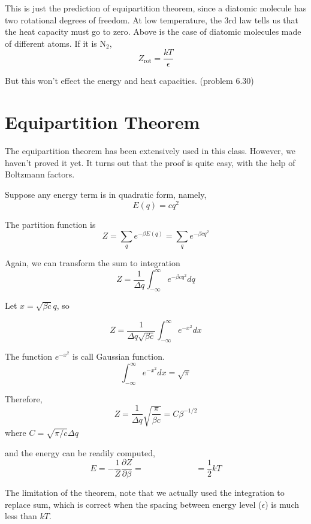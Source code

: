 This is just the prediction of equipartition theorem, since a diatomic molecule has two rotational degrees of freedom. 
At low temperature, the 3rd law tells us that the heat capacity must go to zero.
Above is the case of diatomic molecules made of different atoms. If it is N$_2$, 
\begin{equation}
Z_\text{rot} = \frac{kT}{\epsilon}
\end{equation}
 
But this won't effect the energy and heat capacities. (problem 6.30)


\section{Equipartition Theorem}
The equipartition theorem has been extensively used in this class. However, we haven't proved it yet.
It turns out that the proof is quite easy, with the help of Boltzmann factors.

Suppose any energy term is in quadratic form, namely,
\begin{equation}
E(q) = cq^2
\end{equation}

The partition function is
\begin{equation}
Z = \sum_q e^{-\beta E(q)} = \sum_q e^{-\beta cq^2}
\end{equation}

Again, we can transform the sum to integration
\begin{equation}
Z = \frac{1}{\Delta{q}} \int_{-\infty}^{\infty}  e^{-\beta cq^2} dq
\end{equation}

Let $x=\sqrt{\beta c}q$, so 

\begin{equation}
Z = \frac{1}{\Delta{q}\sqrt{\beta c}}\int_{-\infty}^{\infty}  e^{-x^2} dx
\end{equation}

The function $e^{-x^2}$ is call Gaussian function.
\begin{equation}
\int_{-\infty}^{\infty}  e^{-x^2} dx = \sqrt{\pi}
\end{equation}

Therefore,
\begin{equation}
Z = \frac{1}{\Delta{q}} \sqrt{\frac{\pi}{\beta c}} = C\beta^{-1/2}
\end{equation}
where $C=\sqrt{\pi/c}\Delta{q}$

and the energy can be readily computed,
\begin{equation}
E = -\frac{1}{Z} \frac{\partial Z}{\partial {\beta}} = ~~~~~~~~~~~~~~~~~~~~~~~~~~~~ = \frac{1}{2}kT
\end{equation}

The limitation of the theorem, note that we actually used the integration to replace sum, which is correct when the spacing between energy level ($\epsilon$) is much less than $kT$.


